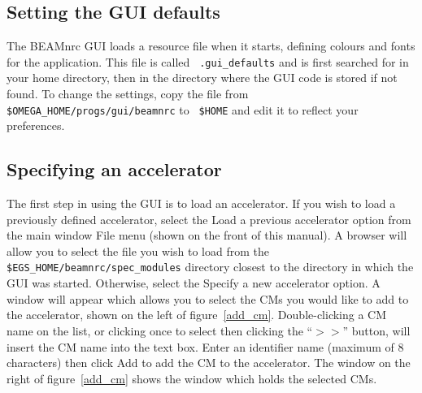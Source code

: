 \documentclass[12pt,twoside]{article}
\begin{document}
\subsection{Setting the GUI defaults}

The BEAMnrc GUI loads a resource file when it starts, defining
colours and fonts for the application.  This file is called {\tt
.gui\_defaults} and is first searched for in your home directory, then in
the directory where the GUI code is stored if not found.  To change the
settings, copy the file from {\tt \$OMEGA\_HOME/progs/gui/beamnrc} to {\tt
\$HOME} and edit it to reflect your preferences.


\subsection{Specifying an accelerator}

The first step in using the GUI is to load an accelerator.  If you wish
to load a previously defined accelerator, select
the {\sf Load a previous accelerator} option from the main window {\sf File}
menu (shown on the front of this manual).  A browser will allow you to select
the file you wish to load from the {\tt \$EGS\_HOME/beamnrc/spec\_modules}
directory closest to the directory in which the GUI was started.
Otherwise, select the {\sf Specify a new
accelerator} option.  A window will appear which allows you to select
the CMs you would like to add to the accelerator, shown on the left of
figure~\ref{add_cm}.
Double-clicking a CM name on the list, or clicking once to select then
clicking the ``$>>$'' button, will insert
the CM name into the text box.  Enter an identifier name (maximum of 8
characters) then click {\sf Add} to add the CM to the accelerator.
The window on the right of figure~\ref{add_cm} shows the window which holds the
selected CMs.
\end{document}
